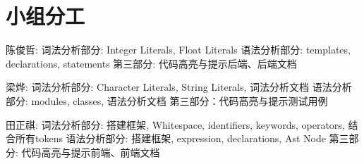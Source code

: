 \section{小组分工}

陈俊哲: 词法分析部分: Integer Literals, Float Literals
语法分析部分: templates, declarations, statements
第三部分: 代码高亮与提示后端、后端文档

梁烨: 词法分析部分: Character Literals, String Literals, 词法分析文档
语法分析部分: modules, classes, 语法分析文档
第三部分：代码高亮与提示测试用例

田正祺: 词法分析部分: 搭建框架, Whitespace, identifiers, keywords, operators, 结合所有tokens
语法分析部分: 搭建框架, expression, declarations, Ast Node
第三部分: 代码高亮与提示前端、前端文档